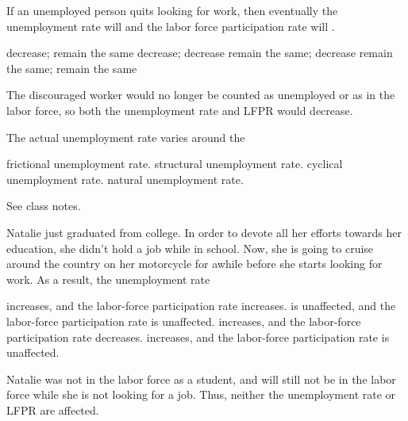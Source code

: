 \documentclass[addpoints,11pt]{exam}
\theoremstyle{definition}
\newcommand{\blank}[0]{\underline{\hspace{3cm}}}
\begin{document}
\begin{questions}
	\question If an unemployed person quits looking for work, then eventually the unemployment rate will \blank and the labor force participation rate will \blank.
	
	\begin{choices}
		\choice decrease; remain the same
		\CorrectChoice decrease; decrease
		\choice remain the same; decrease
		\choice remain the same; remain the same
	\end{choices}
	
	\begin{solution}
		The discouraged worker would no longer be counted as unemployed or as in the labor force, so both the unemployment rate and LFPR would decrease.
	\end{solution}
	
		\question The actual unemployment rate varies around the 
		
		\begin{choices}
			\choice frictional unemployment rate.
			\choice structural unemployment rate.
			\choice cyclical unemployment rate. 
			\CorrectChoice natural unemployment rate.
		\end{choices}
		
		\begin{solution}
			See class notes.
		\end{solution}
		
	\newpage
	
		\question Natalie just graduated from college. In order to devote all her efforts towards her education, she didn't hold a job while in school. Now, she is going to cruise around the country on her motorcycle for awhile before she starts looking for work. As a result, the unemployment rate
		
		
		\begin{choices}
			\choice increases, and the labor-force participation rate increases.
			\CorrectChoice is unaffected, and the labor-force participation rate is unaffected.
			\choice increases, and the labor-force participation rate decreases. 
			\choice increases, and the labor-force participation rate is unaffected.
		\end{choices}
		
		\begin{solution}
			Natalie was not in the labor force as a student, and will still not be in the labor force while she is not looking for a job. Thus, neither the unemployment rate or LFPR are affected.
		\end{solution}
	

\end{questions}
\end{document}
